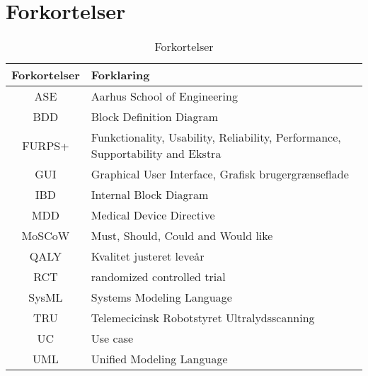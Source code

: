 \chapter{Forkortelser}

\begin{table}[htb]
\centering
\begin{tabular}{ | c | p{} | }
\hline
\textbf{Forkortelser} & \textbf{Forklaring} \\\hline
ASE & Aarhus School of Engineering \\\hline
BDD & Block Definition Diagram \\\hline
FURPS+ & Funkctionality, Usability, Reliability, Performance, Supportability and Ekstra \\\hline
GUI & Graphical User Interface, Grafisk brugergrænseflade \\\hline
IBD & Internal Block Diagram \\\hline
MDD & Medical Device Directive \\\hline
MoSCoW & Must, Should, Could and Would like \\\hline
QALY & Kvalitet justeret leveår  \\\hline
RCT & randomized controlled trial \\\hline
SysML & Systems Modeling Language \\\hline
TRU & Telemecicinsk Robotstyret Ultralydsscanning \\\hline
UC & Use case \\\hline
UML & Unified Modeling Language \\\hline

\end{tabular}
\caption{Forkortelser}
\end{table}

\vspace{3cm}